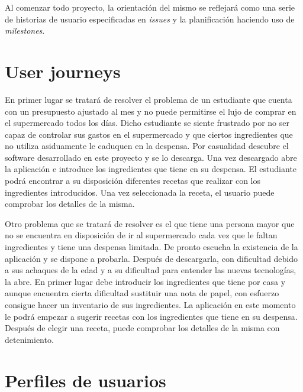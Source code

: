 Al comenzar todo proyecto, la orientación del mismo se reflejará como una serie de historias de usuario especificadas en \emph{issues} y la planificación haciendo uso de \emph{milestones}.

\section{User journeys}

En primer lugar se tratará de resolver el problema de un estudiante que cuenta con un presupuesto ajustado al mes y no puede permitirse el lujo de comprar en el supermercado todos los días. Dicho estudiante se siente frustrado por no ser capaz de controlar sus gastos en el supermercado y que ciertos ingredientes que no utiliza asiduamente le caduquen en la despensa. Por casualidad descubre el software desarrollado en este proyecto y se lo descarga. Una vez descargado abre la aplicación e introduce los ingredientes que tiene en su despensa. El estudiante podrá encontrar a su disposición diferentes recetas que realizar con los ingredientes introducidos. Una vez seleccionada la receta, el usuario puede comprobar los detalles de la misma.

Otro problema que se tratará de resolver es el que tiene una persona mayor que no se encuentra en disposición de ir al supermercado cada vez que le faltan ingredientes y tiene una despensa limitada. De pronto escucha la existencia de la aplicación y se dispone a probarla. Después de descargarla, con dificultad debido a sus achaques de la edad y a su dificultad para entender las nuevas tecnologías, la abre. En primer lugar debe introducir los ingredientes que tiene por casa y aunque encuentra cierta dificultad sustituir una nota de papel, con esfuerzo consigue hacer un inventario de sus ingredientes. La aplicación en este momento le podrá empezar a sugerir recetas con los ingredientes que tiene en su despensa. Después de elegir una receta, puede comprobar los detalles de la misma con detenimiento.

\section{Perfiles de usuarios}
